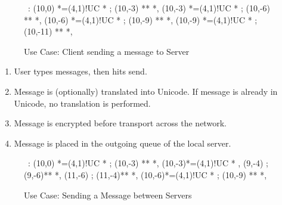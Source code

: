 

\begin{figure}[ht]

\small

\begin{center}

\ \xy<1cm,0cm>:
(10,0) 	*=(4,1)!UC *\frm{-} ;
(10,-3) **\dir{-} *\dir{>},
(10,-3)	*=(4,1)!UC *\frm{--} ; 
(10,-6) **\dir{-} *\dir{>},
(10,-6)	*=(4,1)!UC *\frm{--} ; 
(10,-9) **\dir{-} *\dir{>},
(10,-9)	*=(4,1)!UC *\frm{-} ; 
(10,-11) **\dir{=} *\dir{>},
\endxy

\end{center}

\caption{Use Case: Client sending a message to Server}

\end{figure}


\begin{enumerate}

\item User types messages, then hits send.

\item Message is (optionally) translated into Unicode. If message is
already in Unicode, no translation is performed.

\item Message is encrypted before transport across the network.

\item Message is placed in the outgoing queue of the local server.

\end{enumerate}


\begin{figure}[ht]

\small

\begin{center}

\ \xy<1cm,0cm>:
(10,0) *=(4,1)!UC *\frm{-} ;
(10,-3) **\dir{-} *\dir{>},
(10,-3)*=(4,1)!UC *\frm{-} , 
(9,-4) ; (9,-6)**\dir{-} *\dir{>},
(11,-6) ; (11,-4)**\dir{--} *\dir{>},
(10,-6)*=(4,1)!UC *\frm{-} ; 
(10,-9) **\dir{=} *\dir{>},
\endxy

\end{center}

\caption{Use Case: Sending a Message between Servers}

\end{figure}


